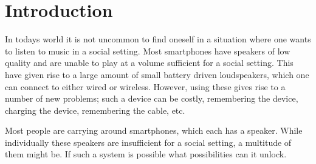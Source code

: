 \chapter{Introduction}\label{cha:introduction}
%
% 
%
%
%
%
%

In todays world it is not uncommon to find oneself in a situation where one wants to listen to music in a social setting.
Most smartphones have speakers of low quality and are unable to play at a volume sufficient for a social setting. 
This have given rise to a large amount of small battery driven loudspeakers, which one can connect to either wired or wireless.
However, using these gives rise to a number of new problems; such a device can be costly, remembering the device, charging the device, remembering the cable, etc.

Most people are carrying around smartphones, which each has a speaker.
While individually these speakers are insufficient for a social setting, a multitude of them might be.
If such a system is possible what possibilities can it unlock. 
